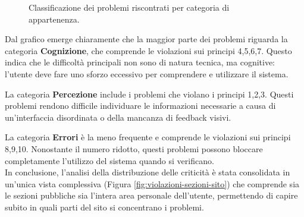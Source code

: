 \begin{figure}[H]
  \centering
  \caption{Classificazione dei problemi riscontrati per categoria di appartenenza.}
  \label{fig:categorie-principi-nielsen}
\end{figure}

Dal grafico emerge chiaramente che la maggior parte dei problemi riguarda la categoria \textbf{Cognizione}, che comprende le violazioni sui principi 4,5,6,7.
Questo indica che le difficoltà principali non sono di natura tecnica, ma cognitive: l'utente deve fare uno sforzo eccessivo per comprendere e utilizzare il sistema.

La categoria \textbf{Percezione} include i problemi che violano i principi 1,2,3. Questi problemi rendono difficile individuare le informazioni necessarie a causa di un'interfaccia disordinata o della mancanza di feedback visivi.

La categoria \textbf{Errori} è la meno frequente e comprende le violazioni sui principi 8,9,10. Nonostante il numero ridotto, questi problemi possono bloccare completamente l'utilizzo del sistema quando si verificano. \\

In conclusione, l'analisi della distribuzione delle criticità è stata consolidata in un'unica vista complessiva (Figura \ref{fig:violazioni-sezioni-sito}) che comprende sia le sezioni pubbliche sia l'intera area personale dell'utente, permettendo di capire subito in quali parti del sito si concentrano i problemi.

